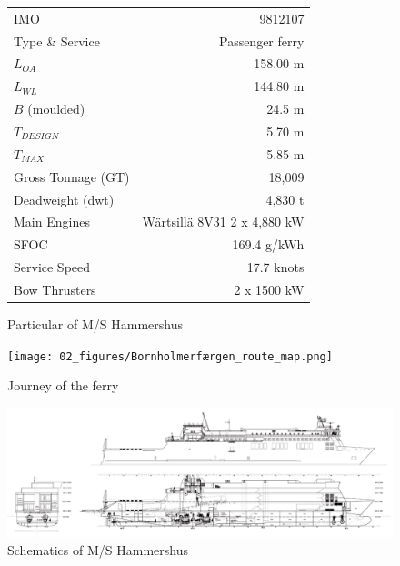 \begin{figure}[ht]
  \begin{minipage}{0.55\linewidth} %
    \footnotesize
    \centering
    \begin{tabular}{l r}
        \hline
        IMO & 9812107 \\
        Type \& Service & Passenger ferry \\
        $L_{OA}$ & 158.00 m\\
        $L_{WL}$ & 144.80 m\\
        $B$ (moulded) & 24.5 m\\
        $T_{DESIGN}$ & 5.70 m\\
        $T_{MAX}$ & 5.85 m \\ 
        Gross Tonnage (GT) & 18,009 \\
        Deadweight (dwt) & 4,830 t \\
        Main Engines & Wärtsillä 8V31 2 x 4,880 kW \\
        SFOC & 169.4 g/kWh \\
        Service Speed & 17.7 knots \\
        Bow Thrusters & 2 x 1500 kW \\
        \hline
    \end{tabular}
    \caption{Particular of M/S Hammershus}
    \label{tbl:Hammershus_Data}
  \end{minipage}
  \hspace{0.01\linewidth}
  \begin{minipage}{0.43\linewidth} %
    \centering
    \texttt{[image: 02\_figures/Bornholmerfærgen\_route\_map.png]} %
    \caption{Journey of the ferry}
    \label{fig:Hammershus_journey_map}
  \end{minipage}
\end{figure}


\begin{figure}[h]
    \centering
        \includegraphics[width=\textwidth]{02_figures/Hammershus_Pict.jpg}
        \caption{Schematics of M/S Hammershus}
        \label{fig:Hammershus_Pict}
\end{figure}

